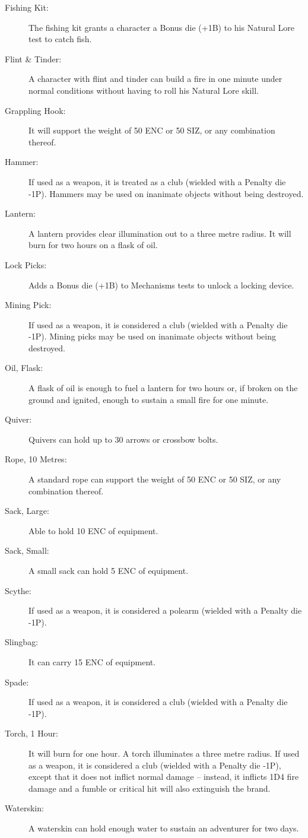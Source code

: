 \begin{description}
	\item[Fishing Kit:] The fishing kit grants a character a Bonus die (+1B) to his Natural Lore test to catch fish. 
	\item[Flint \& Tinder:] A character with flint and tinder can build a fire in one minute under normal conditions without having to roll his Natural Lore skill. 
	\item[Grappling Hook:] It will support the weight of 50 ENC or 50 SIZ, or any combination thereof. 
	\item[Hammer:] If used as a weapon, it is treated as a club (wielded with a Penalty die -1P). Hammers may be used on inanimate objects without being destroyed. 
	\item[Lantern:] A lantern provides clear illumination out to a three metre radius. It will burn for two hours on a flask of oil. 
	\item[Lock Picks:] Adds a Bonus die (+1B) to Mechanisms tests to unlock a locking device. 
	\item[Mining Pick:] If used as a weapon, it is considered a club (wielded with a Penalty die -1P). Mining picks may be used on inanimate objects without being destroyed. 
	\item[Oil, Flask:] A flask of oil is enough to fuel a lantern for two hours or, if broken on the ground and ignited, enough to sustain a small fire for one minute. 
	\item[Quiver:] Quivers can hold up to 30 arrows or crossbow bolts. 
	\item[Rope, 10 Metres:] A standard rope can support the weight of 50 ENC or 50 SIZ, or any combination thereof. 
	\item[Sack, Large:] Able to hold 10 ENC of equipment. 
	\item[Sack, Small:] A small sack can hold 5 ENC of equipment. 
	\item[Scythe:] If used as a weapon, it is considered a polearm (wielded with a Penalty die -1P). 
	\item[Slingbag:] It can carry 15 ENC of equipment. 
	\item[Spade:] If used as a weapon, it is considered a club (wielded with a Penalty die -1P). 
	\item[Torch, 1 Hour:] It will burn for one hour. A torch illuminates a three metre radius. If used as a weapon, it is considered a club (wielded with a Penalty die -1P), except that it does not inflict normal damage – instead, it inflicts 1D4 fire damage and a fumble or critical hit will also extinguish the brand. 
	\item[Waterskin:] A waterskin can hold enough water to sustain an adventurer for two days.
\end{description}

